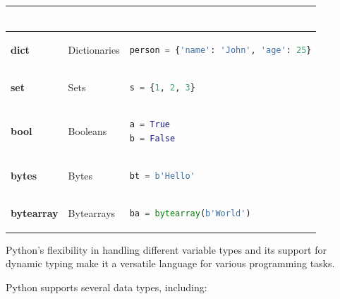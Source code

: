 \documentclass[12pt]{book}
\begin{document}
\begin{table}[htbp]
\begin{tabular}{|l|l|l|}
\begin{lstlisting}[language=Python]
\end{lstlisting} \\ \hline
\textbf{dict} & Dictionaries & \begin{lstlisting}[language=Python]
person = {'name': 'John', 'age': 25}

\end{lstlisting} \\ \hline
\textbf{set} & Sets & \begin{lstlisting}[language=Python]
s = {1, 2, 3}

\end{lstlisting} \\ \hline
\textbf{bool} & Booleans & \begin{lstlisting}[language=Python]
a = True
b = False

\end{lstlisting} \\ \hline
\textbf{bytes} & Bytes & \begin{lstlisting}[language=Python]
bt = b'Hello'

\end{lstlisting} \\ \hline
\textbf{bytearray} & Bytearrays & \begin{lstlisting}[language=Python]
ba = bytearray(b'World')

\end{lstlisting} \\ \hline
\end{tabular}
\label{tab:python-types}
\end{table}


Python's flexibility in handling different variable types and its support for dynamic typing make it a versatile language for various programming tasks.


Python supports several data types, including:
\end{document}
